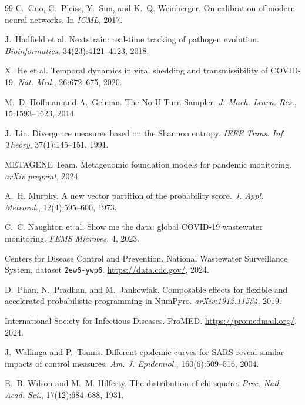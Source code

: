 \documentclass[10pt,twocolumn]{article}
\theoremstyle{definition}
\newcommand{\code}[1]{\texttt{\small #1}}
\begin{document}
{\begin{thebibliography}{99}
C.~Guo, G.~Pleiss, Y.~Sun, and K.~Q. Weinberger. On calibration of modern neural
networks. In \emph{ICML}, 2017.

J.~Hadfield et al. Nextstrain: real-time tracking of pathogen evolution.
\emph{Bioinformatics}, 34(23):4121--4123, 2018.

X.~He et al. Temporal dynamics in viral shedding and transmissibility of
COVID-19. \emph{Nat. Med.}, 26:672--675, 2020.

M.~D. Hoffman and A.~Gelman. The No-U-Turn Sampler. \emph{J. Mach. Learn. Res.},
15:1593--1623, 2014.

J.~Lin. Divergence measures based on the Shannon entropy. \emph{IEEE Trans. Inf.
Theory}, 37(1):145--151, 1991.

METAGENE Team. Metagenomic foundation models for pandemic monitoring.
\emph{arXiv preprint}, 2024.

A.~H. Murphy. A new vector partition of the probability score.
\emph{J. Appl. Meteorol.}, 12(4):595--600, 1973.

C.~C. Naughton et al. Show me the data: global COVID-19 wastewater monitoring.
\emph{FEMS Microbes}, 4, 2023.

Centers for Disease Control and Prevention. National Wastewater Surveillance
System, dataset \code{2ew6-ywp6}. \url{https://data.cdc.gov/}, 2024.

D.~Phan, N.~Pradhan, and M.~Jankowiak. Composable effects for flexible and
accelerated probabilistic programming in NumPyro. \emph{arXiv:1912.11554}, 2019.

International Society for Infectious Diseases. ProMED.
\url{https://promedmail.org/}, 2024.

J.~Wallinga and P.~Teunis. Different epidemic curves for SARS reveal similar
impacts of control measures. \emph{Am. J. Epidemiol.}, 160(6):509--516, 2004.

E.~B. Wilson and M.~M. Hilferty. The distribution of chi-square. \emph{Proc.
Natl. Acad. Sci.}, 17(12):684--688, 1931.


\end{thebibliography}}
\end{document}
